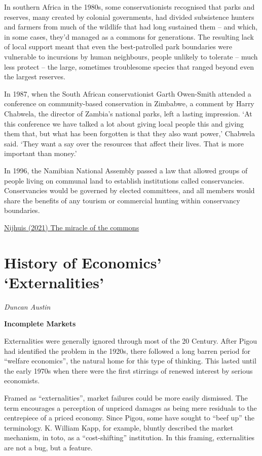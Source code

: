 \documentclass[
]{book}
\begin{document}
In southern Africa in the 1980s, some conservationists recognised that parks and reserves, many created by colonial governments, had divided subsistence hunters and farmers from much of the wildlife that had long sustained them -- and which, in some cases, they'd managed as a commons for generations. The resulting lack of local support meant that even the best-patrolled park boundaries were vulnerable to incursions by human neighbours, people unlikely to tolerate -- much less protect -- the large, sometimes troublesome species that ranged beyond even the largest reserves.

In 1987, when the South African conservationist Garth Owen-Smith attended a conference on community-based conservation in Zimbabwe, a comment by Harry Chabwela, the director of Zambia's national parks, left a lasting impression. `At this conference we have talked a lot about giving local people this and giving them that, but what has been forgotten is that they also want power,' Chabwela said. `They want a say over the resources that affect their lives. That is more important than money.'

In 1996, the Namibian National Assembly passed a law that allowed groups of people living on communal land to establish institutions called conservancies. Conservancies would be governed by elected committees, and all members would share the benefits of any tourism or commercial hunting within conservancy boundaries.

\href{The\%20miracle\%20of\%20the\%20commons}{Nijhuis (2021) The miracle of the commons}

\hypertarget{history-of-economics-externalities}{%
\section{History of Economics' `Externalities'}\label{history-of-economics-externalities}}

\emph{Duncan Austin}

\textbf{Incomplete Markets}

Externalities were generally ignored through most of the 20 Century. After Pigou had
identified the problem in the 1920s, there followed a long barren period for ``welfare
economics'', the natural home for this type of thinking. This lasted until the early 1970s when there were the first stirrings of renewed interest by serious economists.

Framed as ``externalities'', market failures could be more easily dismissed.
The term encourages a perception of unpriced damages as
being mere residuals to the centrepiece of a priced economy.
Since Pigou, some have sought to ``beef up'' the terminology.
K. William Kapp, for example, bluntly described the market mechanism, in toto,
as a ``cost-shifting'' institution.
In this framing, externalities are not a bug, but a feature.
\end{document}
